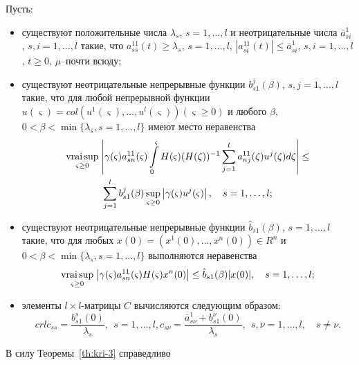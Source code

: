 Пусть:
\begin{itemize}
    \item существуют положительные числа  $ \lambda _s$, $s = 1, \dots, l$ и
    неотрицательные числа $\bar a_{si}^1$, $s,i = 1,
     \dots, l$ такие, что $a^{11}_{ss}(t) \geq
     \lambda _s$, $s = 1,\dots,l$, $|a^{11}_{si}(t)|\leq \bar a^1_{si}$, $s,i = 1, \dots, l$, $t \geq 0$, $\mu$--почти
    всюду;

    \item существуют неотрицательные непрерывные функции $b_{s1}^j(\beta)$,
    $s, j = 1, \dots, l$ такие, что для любой непрерывной функции
    $u(\varsigma ) = col (u^1 (\varsigma), \dots, u^l(\varsigma))
    (\varsigma\geq 0)$ и любого $\beta$, $0 < \beta < \min \{\lambda _s,
    s = 1,
    \dots, l \}$ имеют  место неравенства
\begin{multline*}
     \mathrel {\mathop
     {\operatorname*{vrai} \sup}\limits _{\varsigma \geq 0}} \left |\gamma (\varsigma )a^{11}_{sn}(\varsigma )
    \int \limits _{0}^\varsigma H(\varsigma)(H(\zeta))^{-1}\sum \limits
    _{j=1}^l a_{nj}^{11}(\zeta)u^j(\zeta )d\zeta \right | \leq\\
    \sum\limits_{j=1}^lb_{s1}^j(\beta)\sup \limits _{\varsigma \geq 0}\left|\gamma (\varsigma)u^j(\varsigma)\right|, \quad s = 1,\dots,l;
\end{multline*}
    \item существуют неотрицательные непрерывные функции  $\hat
    b_{s1}(\beta)$, $s= 1, \dots, l$ такие,  что для любых  $ x (0) = (x^1
    (0), \dots, x^n(0)) \in R^n$ и $0 < \beta < \min \{\lambda _s, s = 1,
    \dots, l \}$ выполняются неравенства
    \begin{equation*}
    \mathrel {\mathop
     {\operatorname*{vrai} \sup}\limits _{\varsigma \geq 0}} \left |\gamma (\varsigma )a^{11}_{sn}(\varsigma )
    H(\varsigma)x^n(0)\right | \leq \hat b_{s1}(\beta)|x(0)|, \quad s =
    1,\dots,l;
    \end{equation*}

    \item элементы $l\times l$-матрицы $C$ вычисляются следующим образом:
    \begin{equation*}{crl}
    c_{ss} = \frac{b^s_{s1}(0)}{\lambda _s }, \ \  s = 1,\dots,l, c_{s\nu}
    = \frac{\bar a^{1}_{s\nu} + b^\nu_{s1}(0)}{\lambda _s }, \ \ s,\nu =
    1,\dots,l, \quad s \neq \nu.
    \end{equation*}
\end{itemize}

В силу Теоремы~\ref{th:kri-3} справедливо

